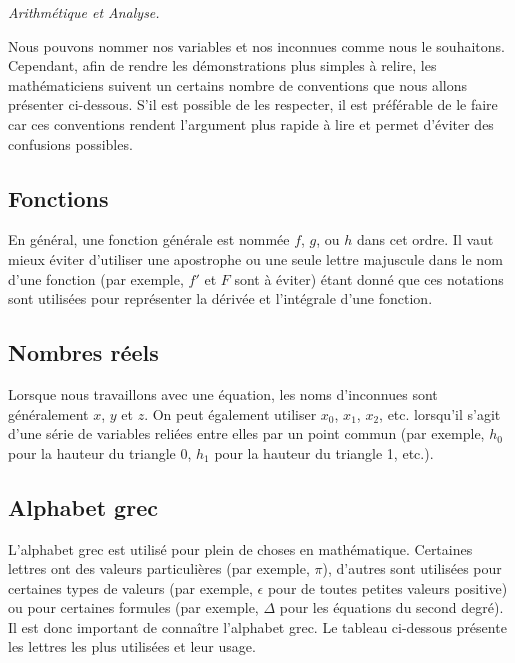 \begin{prerequis}
	\textit{Arithmétique et Analyse.}
\end{prerequis}

Nous pouvons nommer nos variables et nos inconnues comme nous le souhaitons. Cependant, afin de rendre les démonstrations plus simples à relire, les mathématiciens suivent un certains nombre de conventions que nous allons présenter ci-dessous. S'il est possible de les respecter, il est préférable de le faire car ces conventions rendent l'argument plus rapide à lire et permet d'éviter des confusions possibles.

\subsection{Fonctions}

En général, une fonction générale est nommée $f$, $g$, ou $h$ dans cet ordre. Il vaut mieux éviter d'utiliser une apostrophe ou une seule lettre majuscule dans le nom d'une fonction (par exemple, $f'$ et $F$ sont à éviter) étant donné que ces notations sont utilisées pour représenter la dérivée et l'intégrale d'une fonction.

\subsection{Nombres réels}

Lorsque nous travaillons avec une équation, les noms d'inconnues sont généralement $x$, $y$ et $z$. On peut également utiliser $x_0$, $x_1$, $x_2$, etc. lorsqu'il s'agit d'une série de variables reliées entre elles par un point commun (par exemple, $h_0$ pour la hauteur du triangle 0, $h_1$ pour la hauteur du triangle 1, etc.).

\subsection{Alphabet grec}

L'alphabet grec est utilisé pour plein de choses en mathématique. Certaines lettres ont des valeurs particulières (par exemple, $\pi$), d'autres sont utilisées pour certaines types de valeurs (par exemple, $\epsilon$ pour de toutes petites valeurs positive) ou pour certaines formules (par exemple, $\Delta$ pour les équations du second degré). Il est donc important de connaître l'alphabet grec. Le tableau ci-dessous présente les lettres les plus utilisées et leur usage.

